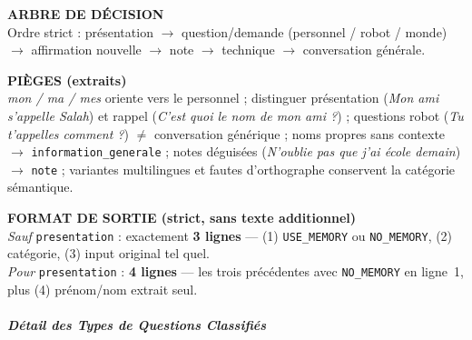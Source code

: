 \documentclass[a4paper,12pt]{report}
\begin{document}
\begin{tcolorbox}
		\vspace{0.35em}
		\textbf{ARBRE DE DÉCISION} \\
		Ordre strict : présentation $\rightarrow$ question/demande (personnel / robot /
		monde) $\rightarrow$ affirmation nouvelle $\rightarrow$ note $\rightarrow$
		technique $\rightarrow$ conversation générale.
		
		\vspace{0.35em}
		\textbf{PIÈGES (extraits)} \\
		\textit{mon / ma / mes} oriente vers le personnel ; distinguer présentation
		(\textit{Mon ami s'appelle Salah}) et rappel (\textit{C'est quoi le nom de mon
			ami ?}) ; questions robot (\textit{Tu t'appelles comment ?}) $\neq$
		conversation générique ; noms propres sans contexte $\rightarrow$
		\texttt{information\_generale} ; notes déguisées (\textit{N'oublie pas que j'ai
			école demain}) $\rightarrow$ \texttt{note} ; variantes multilingues et fautes
		d'orthographe conservent la catégorie sémantique.
		
		\vspace{0.35em}
		\textbf{FORMAT DE SORTIE (strict, sans texte additionnel)} \\
		\textit{Sauf} \texttt{presentation} : exactement \textbf{3 lignes} — (1)
		\texttt{USE\_MEMORY} ou \texttt{NO\_MEMORY}, (2) catégorie, (3) input original
		tel quel. \\
		\textit{Pour} \texttt{presentation} : \textbf{4 lignes} — les trois précédentes
		avec \texttt{NO\_MEMORY} en ligne~1, plus (4) prénom/nom extrait seul.
		
	\end{tcolorbox}
	
	\vspace{0.8em}
	\subparagraph{Détail des Types de Questions Classifiés}
	
	\vspace{0.3em}
	
\end{document}
